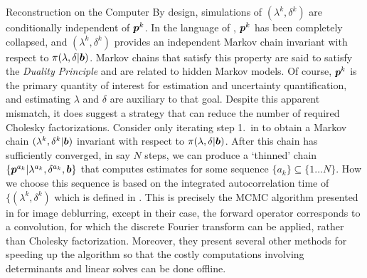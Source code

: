 \begin{chapter}{Reconstruction on the Computer}
By design, simulations of $(\lambda^k,\delta^k)$ are conditionally independent of $\mbox{\boldmath$p$}^k$.
In the language of \citep{van2008partially}, $\mbox{\boldmath$p$}^k$ has been completely collapsed, and $(\lambda^k,\delta^k)$ provides an independent Markov chain invariant with respect to $\pi(\lambda,\delta|\mbox{\boldmath$b$})$.
Markov chains that satisfy this property are said to satisfy the \emph{Duality Principle} \citep[Section 9.2.3]{robert2013monte} and are related to hidden Markov models. %
Of course, $\mbox{\boldmath$p$}^k$ is the primary quantity of interest for estimation and uncertainty quantification, and estimating $\lambda$ and $\delta$ are auxiliary to that goal.
Despite this apparent mismatch, it does suggest a strategy that can reduce the number of required Cholesky factorizations.
Consider only iterating step 1.~in  to obtain a Markov chain $(\lambda^k,\delta^k|\mbox{\boldmath$b$})$ invariant with respect to $\pi(\lambda,\delta|\mbox{\boldmath$b$})$. 
After this chain has sufficiently converged, in say $N$ steps, we can produce a `thinned' chain $\{\mbox{\boldmath$p$}^{a_k}|\lambda^{a_k},\delta^{a_k},\mbox{\boldmath$b$}\}$ that computes estimates for some sequence $\{a_k\} \subseteq \{1\dots N\}$.
How we choose this sequence is based on the integrated autocorrelation time of $\{(\lambda^k,\delta^k)$ which is defined in .
This is precisely the MCMC algorithm presented in \citep{fox2015fast} for image deblurring, except in their case, the forward operator corresponds to a convolution, for which the discrete Fourier transform can be applied, rather than Cholesky factorization.
Moreover, they present several other methods for speeding up the algorithm so that the costly computations involving determinants and linear solves can be done offline.


\end{chapter}
